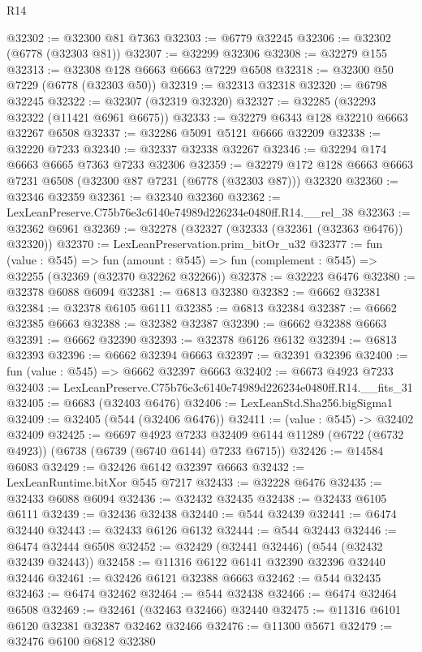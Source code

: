 \begin{lexlean}{R14}
\begin{coremodule}
@32302 := @32300 @81 @7363
@32303 := @6779 @32245
@32306 := @32302 (@6778 (@32303 @81))
@32307 := @32299 @32306
@32308 := @32279 @155
@32313 := @32308 @128 @6663 @6663 @7229 @6508
@32318 := @32300 @50 @7229 (@6778 (@32303 @50))
@32319 := @32313 @32318
@32320 := @6798 @32245
@32322 := @32307 (@32319 @32320)
@32327 := @32285 (@32293 @32322 (@11421 @6961 @6675))
@32333 := @32279 @6343 @128 @32210 @6663 @32267 @6508
@32337 := @32286 @5091 @5121 @6666 @32209
@32338 := @32220 @7233
@32340 := @32337 @32338 @32267
@32346 := @32294 @174 @6663 @6665 @7363 @7233 @32306
@32359 := @32279 @172 @128 @6663 @6663 @7231 @6508 (@32300 @87 @7231 (@6778 (@32303 @87))) @32320
@32360 := @32346 @32359
@32361 := @32340 @32360
@32362 := LexLeanPreserve.C75b76e3c6140e74989d226234e0480ff.R14.__rel_38
@32363 := @32362 @6961
@32369 := @32278 (@32327 (@32333 (@32361 (@32363 @6476)) @32320))
@32370 := LexLeanPreservation.prim_bitOr_u32
@32377 := fun (value : @545) =>
  fun (amount : @545) => fun (complement : @545) => @32255 (@32369 (@32370 @32262 @32266))
@32378 := @32223 @6476
@32380 := @32378 @6088 @6094
@32381 := @6813 @32380
@32382 := @6662 @32381
@32384 := @32378 @6105 @6111
@32385 := @6813 @32384
@32387 := @6662 @32385 @6663
@32388 := @32382 @32387
@32390 := @6662 @32388 @6663
@32391 := @6662 @32390
@32393 := @32378 @6126 @6132
@32394 := @6813 @32393
@32396 := @6662 @32394 @6663
@32397 := @32391 @32396
@32400 := fun (value : @545) => @6662 @32397 @6663
@32402 := @6673 @4923 @7233
@32403 := LexLeanPreserve.C75b76e3c6140e74989d226234e0480ff.R14.__fits_31
@32405 := @6683 (@32403 @6476)
@32406 := LexLeanStd.Sha256.bigSigma1
@32409 := @32405 (@544 (@32406 @6476))
@32411 := (value : @545) -> @32402 @32409
@32425 := @6697
    @4923
    @7233
    @32409
    @6144
    @11289
    (@6722 (@6732 @4923))
    (@6738 (@6739 (@6740 @6144) @7233 @6715))
@32426 := @14584 @6083
@32429 := @32426 @6142 @32397 @6663
@32432 := LexLeanRuntime.bitXor @545 @7217
@32433 := @32228 @6476
@32435 := @32433 @6088 @6094
@32436 := @32432 @32435
@32438 := @32433 @6105 @6111
@32439 := @32436 @32438
@32440 := @544 @32439
@32441 := @6474 @32440
@32443 := @32433 @6126 @6132
@32444 := @544 @32443
@32446 := @6474 @32444 @6508
@32452 := @32429 (@32441 @32446) (@544 (@32432 @32439 @32443))
@32458 := @11316 @6122 @6141 @32390 @32396 @32440 @32446
@32461 := @32426 @6121 @32388 @6663
@32462 := @544 @32435
@32463 := @6474 @32462
@32464 := @544 @32438
@32466 := @6474 @32464 @6508
@32469 := @32461 (@32463 @32466) @32440
@32475 := @11316 @6101 @6120 @32381 @32387 @32462 @32466
@32476 := @11300 @5671
@32479 := @32476 @6100 @6812 @32380

\end{coremodule}
\end{lexlean}
